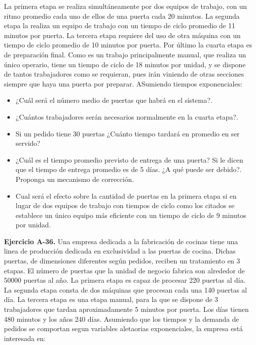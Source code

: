 \documentclass[
]{book}
\providecommand{\tightlist}{%
  \setlength{\itemsep}{0pt}\setlength{\parskip}{0pt}}
\theoremstyle{definition}
\theoremstyle{definition}
\theoremstyle{definition}
\theoremstyle{definition}
\theoremstyle{remark}
\begin{document}
La primera etapa se realiza simultáneamente por dos equipos de trabajo, con un ritmo promedio cada uno de ellos de una puerta cada 20 minutos. La segunda etapa la realiza un equipo de trabajo con un tiempo de ciclo promedio de 11 minutos por puerta. La tercera etapa requiere del uso de otra máquina con un
tiempo de ciclo promedio de 10 minutos por puerta. Por último la cuarta etapa es de preparación final. Como es un trabajo principalmente manual, que realiza un único operario, tiene un tiempo de ciclo de 18
minutos por unidad, y se dispone de tantos trabajadores como se requieran, pues irán viniendo de otras secciones siempre que haya una puerta por preparar. ASumiendo tiempos exponenciales:

\begin{itemize}
\tightlist
\item
  ¿Cuál será el número medio de puertas que habrá en el sistema?.
\item
  ¿Cuántos trabajadores serán necesarios normalmente en la cuarta etapa?.
\item
  Si un pedido tiene 30 puertas ¿Cuánto tiempo tardará en promedio en ser servido?
\item
  ¿Cuál es el tiempo promedio previsto de entrega de una puerta? Si le dicen que el tiempo de entrega promedio es de 5 días. ¿A qué puede ser debido?. Proponga un mecanismo de corrección.
\item
  Cual será el efecto sobre la cantidad de puertas en la primera etapa si en lugar de dos equipos de trabajo con tiempos de ciclo como los citados se establece un único equipo más eficiente con un tiempo de ciclo de 9 minutos por unidad.
\end{itemize}

\textbf{Ejercicio A-36.} Una empresa dedicada a la fabricación de cocinas tiene una linea de producción dedicada en exclusividad a las puertas de cocina. Dichas puertas, de dimensiones diferentes según pedidos, reciben un tratamiento en 3 etapas. El número de puertas que la unidad de negocio fabrica son alrededor de 50000 puertas al año. La primera etapa es capaz de procesar 220 puertas al día. La segunda etapa consta de dos máquinas que procesan cada una 140 puertas al día. La tercera etapa es una etapa manual, para la que se dispone de 3 trabajadores que tardan aproximadamente 5 minutos por puerta. Los días tienen 480 minutos y los años 240 días. Asumiendo que los tiempos y la demanda de pedidos se comportan segun variables aletaorias exponenciales, la empresa está interesada en:
\end{document}
